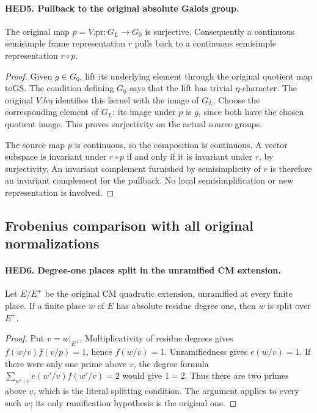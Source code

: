 \paragraph{HED5. Pullback to the original absolute Galois group.}
\label{claim:HED5}
The original map \(p=V.\mathrm{pr}:G_L\to G_0\) is surjective.
Consequently a continuous semisimple frame representation \(r\)
pulls back to a continuous semisimple representation \(r\circ p\).
\begin{proof}
Given \(g\in G_0\), lift its underlying element through the
original quotient map \(\mathrm{toGS}\).  The condition defining
\(G_0\) says that the lift has trivial \(\eta\)-character.
The original \(V.h\eta\) identifies this kernel with the image of
\(G_L\).  Choose the corresponding element of \(G_L\); its image
under \(p\) is \(g\), since both have the chosen quotient image.
This proves surjectivity on the actual source groups.

The source map \(p\) is continuous, so the composition is continuous.
A vector subspace is invariant under \(r\circ p\) if and only if
it is invariant under \(r\), by surjectivity.  An invariant
complement furnished by semisimplicity of \(r\) is therefore an
invariant complement for the pullback.  No local semisimplification
or new representation is involved.
\end{proof}

\subsection{Frobenius comparison with all original normalizations}

\paragraph{HED6. Degree-one places split in the unramified CM extension.}
\label{claim:HED6}
Let \(E/E^+\) be the original CM quadratic extension, unramified at
every finite place.  If a finite place \(w\) of \(E\) has absolute
residue degree one, then \(w\) is split over \(E^+\).
\begin{proof}
Put \(v=w|_{E^+}\).  Multiplicativity of residue degrees gives
\(f(w/v)f(v/p)=1\), hence \(f(w/v)=1\).  Unramifiedness gives
\(e(w/v)=1\).  If there were only one prime above \(v\), the
degree formula \(\sum_{w'\mid v}e(w'/v)f(w'/v)=2\) would give
\(1=2\).  Thus there are two primes above \(v\), which is the
literal splitting condition.  The argument applies to every such
\(w\); its only ramification hypothesis is the original one.
\end{proof}


